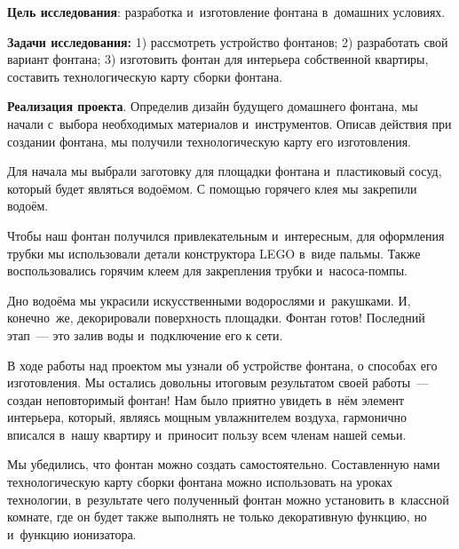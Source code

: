 


\makeProcTitleSchool


\textbf{Цель исследования}: разработка и~изготовление фонтана в~домашних условиях.

\textbf{Задачи исследования:} 1) рассмотреть устройство фонтанов; 2) разработать свой вариант фонтана; 3) изготовить фонтан для интерьера собственной квартиры, составить технологическую карту сборки фонтана.

\textbf{Реализация проекта}. Определив дизайн будущего домашнего фонтана, мы начали с~выбора необходимых материалов и~инструментов. Описав действия при создании фонтана, мы получили технологическую карту его изготовления.

Для начала мы выбрали заготовку для площадки фонтана и~пластиковый сосуд, который будет являться водоёмом. С помощью горячего клея мы закрепили водоём.

Чтобы наш фонтан получился привлекательным и~интересным, для оформления трубки мы использовали детали конструктора LEGO в~виде пальмы. Также воспользовались горячим клеем для закрепления трубки и~насоса-помпы.

Дно водоёма мы украсили искусственными водорослями и~ракушками. И, конечно~же, декорировали поверхность площадки.
Фонтан готов! Последний этап~--- это залив воды и~подключение его к сети.

В ходе работы над проектом мы узнали об устройстве фонтана, о способах его изготовления. Мы остались довольны итоговым результатом своей работы~--- создан неповторимый фонтан! Нам было приятно увидеть в~нём элемент интерьера, который, являясь мощным увлажнителем воздуха, гармонично вписался в~нашу квартиру и~приносит пользу всем членам нашей семьи.

Мы убедились, что фонтан можно создать самостоятельно. Составленную нами технологическую карту сборки фонтана можно использовать на уроках технологии, в~результате чего полученный фонтан можно установить в~классной комнате, где он будет также выполнять не только декоративную функцию, но и~функцию ионизатора.
